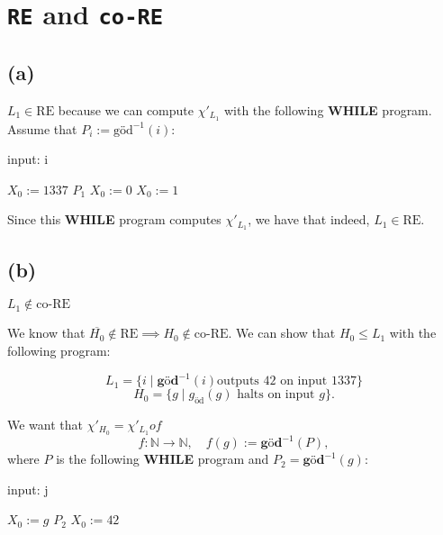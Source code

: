 

\setcounter{section}{3}
\usepackage{algorithm, algpseudocode, listings}



\section{\lstinline|RE| and \lstinline|co-RE|}

\subsection{(a)}

$L_1 \in \text{RE}$ because we can compute $\chi'_{L_1}$ with the following \textbf{WHILE} program. Assume that $P_i := \text{göd}^{-1}(i)$:

\begin{algorithm}
    \caption{input: i}
    \begin{algorithmic}[1]
        \State $X_0 := 1337$
        \State $P_1$
            \State $X_0 := 0$
        \EndWhile
        \State $X_0 := 1$
    \end{algorithmic}
\end{algorithm}

\noindent
Since this \textbf{WHILE} program computes $\chi'_{L_1}$, we have that indeed, $L_1 \in \text{RE}$.

\subsection{(b)}
$L_1 \notin \text{co-RE}$

\noindent
We know that $\overline{H_0} \notin \text{RE} \implies H_0 \notin \text{co-RE}$.  
We can show that $H_0 \leq L_1$ with the following program:

\[
L_1 = \{i \mid \textbf{göd}^{-1}(i) \text{outputs 42 on input 1337} \}
\]
\[
H_0 = \{g \mid g_{\text{öd}}(g) \text{ halts on input } g\}.
\]

We want that $\chi'_{H_0} = \chi'_{L_1} o f$   
\[
f: \mathbb{N} \to \mathbb{N}, \quad f(g) := \textbf{göd}^{-1}(P),
\]
where $P$ is the following \textbf{WHILE} program and $P_2 = \textbf{göd}^{-1}(g)$:

\begin{algorithm}
    \caption{input: j}
    \begin{algorithmic}[1]
        \State $X_0 := g$
        \State $P_2$
        \State $X_0 := 42$
    \end{algorithmic}
\end{algorithm}


